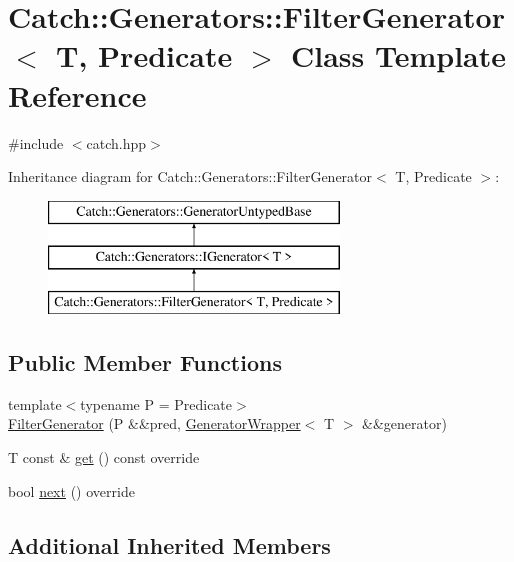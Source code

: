 \hypertarget{class_catch_1_1_generators_1_1_filter_generator}{}\section{Catch\+:\+:Generators\+:\+:Filter\+Generator$<$ T, Predicate $>$ Class Template Reference}
\label{class_catch_1_1_generators_1_1_filter_generator}


{\ttfamily \#include $<$catch.\+hpp$>$}

Inheritance diagram for Catch\+:\+:Generators\+:\+:Filter\+Generator$<$ T, Predicate $>$\+:\begin{figure}[H]
\begin{center}
\leavevmode
\includegraphics[height=3.000000cm]{class_catch_1_1_generators_1_1_filter_generator}
\end{center}
\end{figure}
\subsection*{Public Member Functions}
\begin{DoxyCompactItemize}
\item 
{\footnotesize template$<$typename P  = Predicate$>$ }\\\mbox{\hyperlink{class_catch_1_1_generators_1_1_filter_generator_aa16886a5e41cbd3b6ffa3dd52388a3a1}{Filter\+Generator}} (P \&\&pred, \mbox{\hyperlink{class_catch_1_1_generators_1_1_generator_wrapper}{Generator\+Wrapper}}$<$ T $>$ \&\&generator)
\item 
T const  \& \mbox{\hyperlink{class_catch_1_1_generators_1_1_filter_generator_ab30e81b61a77430661d40f814758f6fe}{get}} () const override
\item 
bool \mbox{\hyperlink{class_catch_1_1_generators_1_1_filter_generator_a02ce0839dcaa7545c55d0fe70cc50e84}{next}} () override
\end{DoxyCompactItemize}
\subsection*{Additional Inherited Members}


